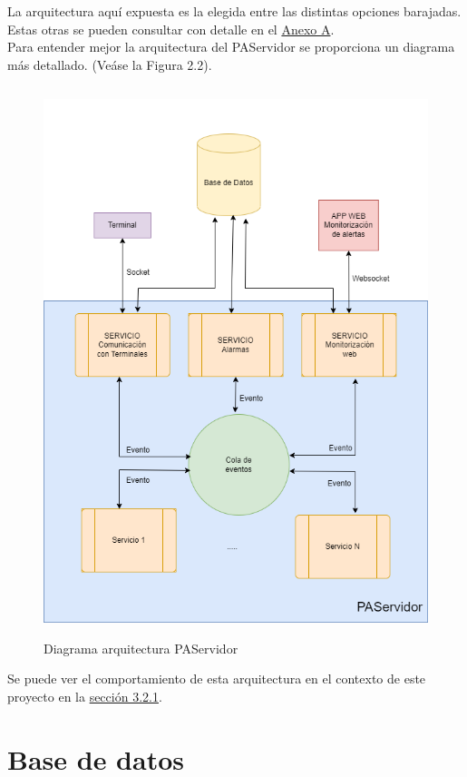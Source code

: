 La arquitectura aquí expuesta es la elegida entre las distintas opciones barajadas. Estas otras se pueden consultar con detalle en el \hyperref[anexo-a]{Anexo A}.\\

Para entender mejor la arquitectura del PAServidor se proporciona un diagrama más detallado. (Veáse la Figura 2.2).

\begin{figure}[H]
    \centering
    \includegraphics[width=1\textwidth,height=16cm]{Imagenes/Arquitectura-PAServidor}
    \caption{Diagrama arquitectura PAServidor}
    \label{fig:PAServidor}
\end{figure}

Se puede ver el comportamiento de esta arquitectura en el contexto de este proyecto en la \hyperref[subsection-comportamiento]{sección 3.2.1}.

\section{Base de datos}

